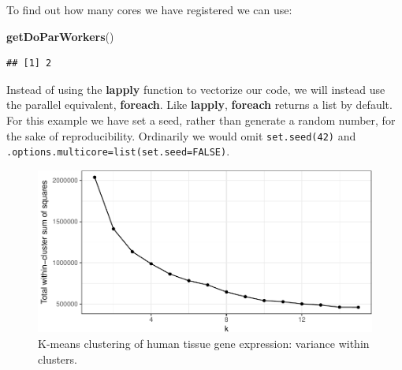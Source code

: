 \documentclass[]{book}
\newenvironment{Shaded}{\begin{snugshade}}{\end{snugshade}}
\newcommand{\KeywordTok}[1]{\textcolor[rgb]{0.13,0.29,0.53}{\textbf{{#1}}}}
\newcommand{\DataTypeTok}[1]{\textcolor[rgb]{0.13,0.29,0.53}{{#1}}}
\newcommand{\DecValTok}[1]{\textcolor[rgb]{0.00,0.00,0.81}{{#1}}}
\newcommand{\StringTok}[1]{\textcolor[rgb]{0.31,0.60,0.02}{{#1}}}
\newcommand{\OtherTok}[1]{\textcolor[rgb]{0.56,0.35,0.01}{{#1}}}
\newcommand{\NormalTok}[1]{{#1}}
\theoremstyle{definition}
\theoremstyle{definition}
\theoremstyle{definition}
\theoremstyle{remark}
\begin{document}
To find out how many cores we have registered we can use:

\begin{Shaded}
\begin{Highlighting}[]
\KeywordTok{getDoParWorkers}\NormalTok{()}
\end{Highlighting}
\end{Shaded}

\begin{verbatim}
## [1] 2
\end{verbatim}

Instead of using the \textbf{lapply} function to vectorize our code, we
will instead use the parallel equivalent, \textbf{foreach}. Like
\textbf{lapply}, \textbf{foreach} returns a list by default. For this
example we have set a seed, rather than generate a random number, for
the sake of reproducibility. Ordinarily we would omit
\texttt{set.seed(42)} and
\texttt{.options.multicore=list(set.seed=FALSE)}.

\begin{Shaded}
\end{Shaded}

\begin{figure}

{\centering \includegraphics[width=1\linewidth]{09-clustering_files/figure-latex/tissueExpressionElbow-1} 

}

\caption{K-means clustering of human tissue gene expression: variance within clusters.}\label{fig:tissueExpressionElbow}
\end{figure}
\end{document}
